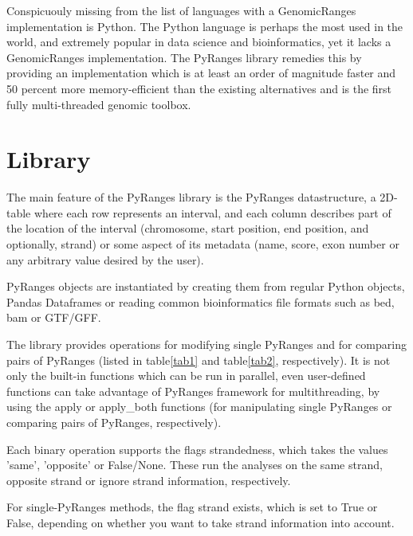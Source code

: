 \documentclass[10pt,letterpaper]{article}
\begin{document}
Conspicuouly missing from the list of languages with a GenomicRanges
implementation is Python. The Python language is perhaps the most used in the
world, and extremely popular in data science and bioinformatics, yet it lacks a
GenomicRanges implementation. The PyRanges library remedies this by providing an
implementation which is at least an order of magnitude faster and 50 percent
more memory-efficient than the existing alternatives and is the first fully
multi-threaded genomic toolbox.

\section*{Library}

The main feature of the PyRanges library is the PyRanges datastructure, a
2D-table where each row represents an interval, and each column describes part
of the location of the interval (chromosome, start position, end position, and
optionally, strand) or some aspect of its metadata (name, score, exon number or
any arbitrary value desired by the user).

PyRanges objects are instantiated by creating them from regular Python objects,
Pandas Dataframes or reading common bioinformatics file formats such as bed, bam
or GTF/GFF.

The library provides operations for modifying single PyRanges and for comparing
pairs of PyRanges (listed in table\ref{tab1} and table\ref{tab2}, respectively).
It is not only the built-in functions which can be run in parallel, even
user-defined functions can take advantage of PyRanges framework for
multithreading, by using the apply or apply\_both functions (for manipulating
single PyRanges or comparing pairs of PyRanges, respectively).

Each binary operation supports the flags strandedness, which takes the values
'same', 'opposite' or False/None. These run the analyses on the same strand,
opposite strand or ignore strand information, respectively.

For single-PyRanges methods, the flag strand exists, which is set to True or
False, depending on whether you want to take strand information into account.
\end{document}

